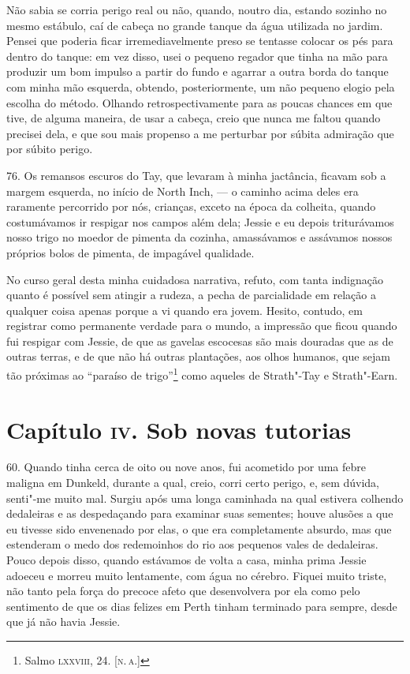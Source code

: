 Não sabia se corria perigo real ou não, quando, noutro dia, estando
sozinho no mesmo estábulo, caí de cabeça no grande tanque da água
utilizada no jardim. Pensei que poderia ficar irremediavelmente preso se
tentasse colocar os pés para dentro do tanque: em vez disso, usei o
pequeno regador que tinha na mão para produzir um bom impulso a partir
do fundo e agarrar a outra borda do tanque com minha mão esquerda,
obtendo, posteriormente, um não pequeno elogio pela escolha do método.
Olhando retrospectivamente para as poucas chances em que tive, de alguma
maneira, de usar a cabeça, creio que nunca me faltou quando precisei
dela, e que sou mais propenso a me perturbar por súbita admiração que
por súbito perigo.

76. Os remansos escuros do Tay, que levaram à minha jactância, ficavam
sob a margem esquerda, no início de North Inch, --- o caminho acima deles
era raramente percorrido por nós, crianças, exceto na época da colheita,
quando costumávamos ir respigar nos campos além dela; Jessie e eu depois
triturávamos nosso trigo no moedor de pimenta da cozinha, amassávamos e
assávamos nossos próprios bolos de pimenta, de impagável qualidade.

No curso geral desta minha cuidadosa narrativa, refuto, com tanta
indignação quanto é possível sem atingir a rudeza, a pecha de
parcialidade em relação a qualquer coisa apenas porque a vi quando era
jovem. Hesito, contudo, em registrar como permanente verdade para o
mundo, a impressão que ficou quando fui respigar com Jessie, de que as
gavelas escocesas são mais douradas que as de outras terras, e de que
não há outras plantações, aos olhos humanos, que sejam tão próximas ao
``paraíso de trigo''\footnote{Salmo \textsc{lxxviii}, 24. {[}\textsc{n.\,a.}{]}} como
aqueles de Strath"-Tay e Strath"-Earn.

\chapter{Capítulo \textsc{iv}. Sob novas tutorias}

60. Quando tinha cerca de oito ou nove anos, fui acometido por uma febre
maligna em Dunkeld, durante a qual, creio, corri certo perigo, e, sem
dúvida, senti"-me muito mal. Surgiu após uma longa caminhada na qual
estivera colhendo dedaleiras e as despedaçando para examinar suas
sementes; houve alusões a que eu tivesse sido envenenado por elas, o que
era completamente absurdo, mas que estenderam o medo dos redemoinhos do
rio aos pequenos vales de dedaleiras. Pouco depois disso, quando
estávamos de volta a casa, minha prima Jessie adoeceu e morreu muito
lentamente, com água no cérebro. Fiquei muito triste, não tanto pela
força do precoce afeto que desenvolvera por ela como pelo sentimento de
que os dias felizes em Perth tinham terminado para sempre, desde que já
não havia Jessie.

